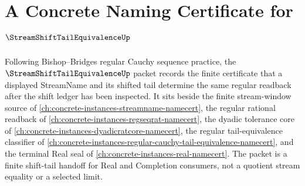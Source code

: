 \chapter{A Concrete Naming Certificate for $\StreamShiftTailEquivalenceUp$}
\label{ch:concrete-instances-stream-shift-tail-equivalence-namecert}

Following Bishop--Bridges regular Cauchy sequence practice, the $\StreamShiftTailEquivalenceUp$ packet records the finite certificate that a displayed StreamName and its shifted tail determine the same regular readback after the shift ledger has been inspected. It sits beside the finite stream-window source of \autoref{ch:concrete-instances-streamname-namecert}, the regular rational readback of \autoref{ch:concrete-instances-regseqrat-namecert}, the dyadic tolerance core of \autoref{ch:concrete-instances-dyadicratcore-namecert}, the regular tail-equivalence classifier of \autoref{ch:concrete-instances-regular-cauchy-tail-equivalence-namecert}, and the terminal Real seal of \autoref{ch:concrete-instances-real-namecert}. The packet is a finite shift-tail handoff for Real and Completion consumers, not a quotient stream equality or a selected limit.

